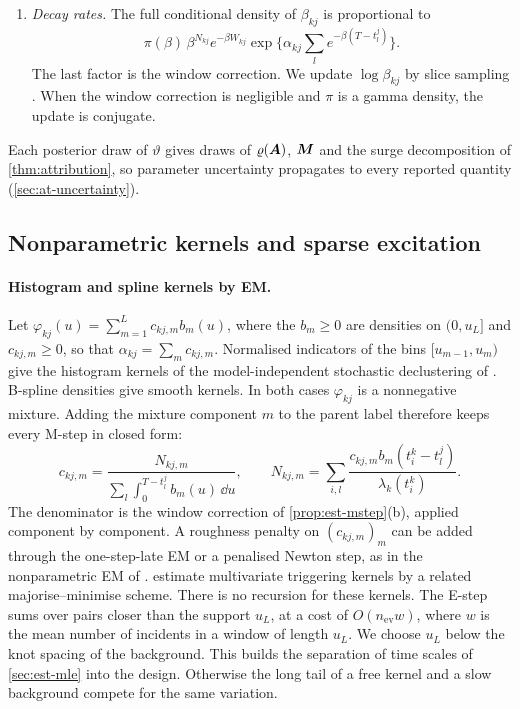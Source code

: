 \begin{enumerate}[(1)]
    $\upsilon_k\mid\cdot\sim\operatorname{Gamma}(a_\upsilon+\sum_eN_{ke},\,b_\upsilon+\sum_eS_e\Psi^T_k(e))$.
    A constant background has $\mu_k\mid\cdot\sim\operatorname{Gamma}(a_\mu+N^0_k,\,b_\mu+T)$.
    For the spline background, a Gaussian prior $\theta_k\sim N(0,(\lambda^{\mathrm{pen}}_kP+\varepsilon\Imat)^{-1})$
    is the Bayesian form of \eqref{eq:est-pen}. Its full conditional, that of a Poisson
    process with log-linear intensity, is log-concave and is updated by a Langevin or
    Laplace-proposal Metropolis step.
  \item \emph{Decay rates.} The full conditional density of $\beta_{kj}$ is proportional
    to
    \[
      \pi(\beta)\,\beta^{N_{kj}}e^{-\beta W_{kj}}\exp\Big\{\alpha_{kj}\sum_le^{-\beta(T-t^j_l)}\Big\}.
    \]
    The last factor is the window correction. We update $\log\beta_{kj}$ by slice sampling
    \citep{neal2003}. When the window correction is negligible and $\pi$ is a gamma
    density, the update is conjugate.
\end{enumerate}
Each posterior draw of $\vartheta$ gives draws of $\varrho(\bm{A})$, $\bm{M}$ and the surge
decomposition of \cref{thm:attribution}, so parameter uncertainty propagates to every
reported quantity (\cref{sec:at-uncertainty}).

\subsection{Nonparametric kernels and sparse excitation}\label{sec:est-nonpar}

\paragraph{Histogram and spline kernels by EM.} Let $\varphi_{kj}(u)=\sum_{m=1}^{L}c_{kj,m}b_m(u)$,
where the $b_m\ge0$ are densities on $(0,u_L]$ and $c_{kj,m}\ge0$, so that
$\alpha_{kj}=\sum_mc_{kj,m}$. Normalised indicators of the bins $[u_{m-1},u_m)$ give the
histogram kernels of the model-independent stochastic declustering of \citet{marsan2008}.
B-spline densities give smooth kernels. In both cases $\varphi_{kj}$ is a nonnegative
mixture. Adding the mixture component $m$ to the parent label therefore keeps every
M-step in closed form:
\[
  c_{kj,m}=\frac{N_{kj,m}}{\sum_{l}\int_0^{T-t^j_l}b_m(u)\,\dd u},\qquad
  N_{kj,m}=\sum_{i,l}\frac{c_{kj,m}b_m(t^k_i-t^j_l)}{\lambda_k(t^k_i)} .
\]
The denominator is the window correction of \cref{prop:est-mstep}(b), applied
component by component. A roughness penalty on $(c_{kj,m})_m$ can be added through the
one-step-late EM \citep{green1990} or a penalised Newton step, as in the nonparametric EM
of \citet{lewis2011}.  estimate multivariate triggering kernels by a
related majorise--minimise scheme. There is no recursion for these kernels. The E-step
sums over pairs closer than the support $u_L$, at a cost of $O(n_{\mathrm{ev}} w)$, where $w$ is the mean
number of incidents in a window of length $u_L$. We choose $u_L$ below the knot spacing
of the background. This builds the separation of time scales of \cref{sec:est-mle} into
the design. Otherwise the long tail of a free kernel and a slow background compete for the
same variation.

